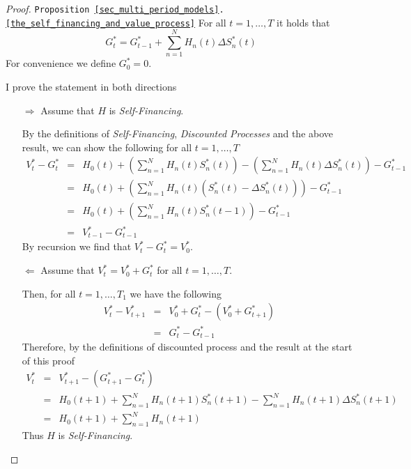 \documentclass[11pt,a4paper]{article}
\begin{document}
  \begin{proof}{\texttt{Proposition \ref{sec_multi_period_models}.\ref{the_self_financing_and_value_process}}}\label{proof_self_financing_and_value_process}
    For all $t=1,\dots,T$ it holds that
    \[ G_t^*=G_{t-1}^*+\sum_{n=1}^NH_n(t)\Delta S_n^*(t) \]
    For convenience we define $G_0^*=0$.
    \par I prove the statement in both directions
    \begin{itemize}
      \item[$\Longrightarrow$] Assume that $H$ is \textit{Self-Financing}.
      \par By the definitions of \textit{Self-Financing}, \textit{Discounted Processes} and the above result, we can show the following for all $t=1,\dots,T$
      \[\begin{array}{rcl}
        V_t^*-G_t^*&=&H_0(t)+\left(\sum_{n=1}^NH_n(t)S_n^*(t)\right)-\left(\sum_{n=1}^NH_n(t)\Delta S_n^*(t)\right)-G_{t-1}^*\\
        &=&H_0(t)+\left(\sum_{n=1}^NH_n(t)(S_n^*(t)-\Delta S_n^*(t))\right)-G_{t-1}^*\\
        &=&H_0(t)+\left(\sum_{n=1}^NH_n(t)S_n^*(t-1)\right)-G_{t-1}^*\\
        &=&V_{t-1}^*-G_{t-1}^*
      \end{array}\]
      By recursion we find that $V_t^*-G_t^*=V_0^*$.

      \item[$\Longleftarrow$] Assume that $V_t^*=V_0^*+G_t^*$ for all $t=1,\dots,T$.
      \par Then, for all $t=1,\dots,T_1$ we have the following
      \[\begin{array}{rcl}
        V_t^*-V_{t+1}^*&=&V_0^*+G_t^*-(V_0^*+G_{t+1}^*)\\
        &=&G_t^*-G_{t-1}^*
      \end{array}\]
      Therefore, by the definitions of discounted process and the result at the start of this proof
      \[\begin{array}{rcl}
        V_t^*&=&V_{t+1}^*-(G_{t+1}^*-G_t^*)\\
        &=&H_0(t+1)+\sum_{n=1}^NH_n(t+1)S_n^*(t+1)-\sum_{n=1}^NH_n(t+1)\Delta S_n^*(t+1)\\
        &=&H_0(t+1)+\sum_{n=1}^NH_n(t+1)
      \end{array}\]
      Thus $H$ is \textit{Self-Financing}.
    \end{itemize}
    \proved
  \end{proof}
\end{document}

